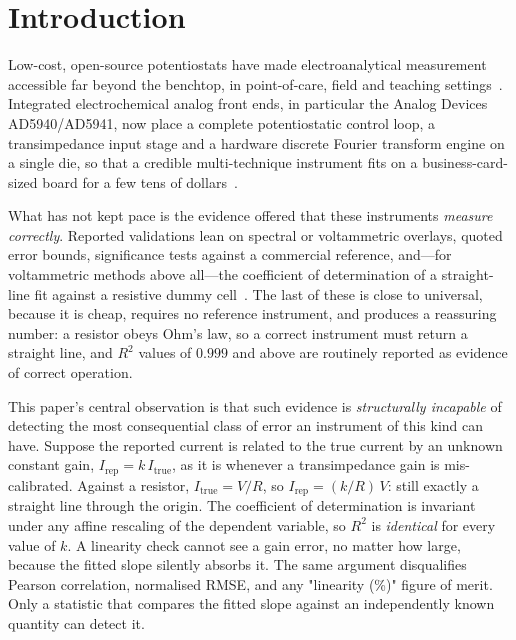 \section{Introduction}
\label{sec:intro}

Low-cost, open-source potentiostats have made electroanalytical measurement
accessible far beyond the benchtop, in point-of-care, field and teaching
settings~\cite{rowe2011cheapstat, jenkins2019abe, brown2022acestat,
bautista2025helpstat, anshori2025ganestat}. Integrated electrochemical analog
front ends, in particular the Analog Devices AD5940/AD5941, now place a
complete potentiostatic control loop, a transimpedance input stage and a
hardware discrete Fourier transform engine on a single die, so that a credible
multi-technique instrument fits on a business-card-sized board for a few tens of
dollars~\cite{devices2024ad5940, bill2023electrochemical, vamos2025hunstat2}.

What has not kept pace is the evidence offered that these instruments
\emph{measure correctly}. Reported validations lean on spectral or voltammetric
overlays, quoted error bounds, significance tests against a commercial
reference, and---for voltammetric methods above all---the coefficient of
determination of a straight-line fit against a resistive dummy
cell~\cite{pruna2018low, matsubara2021small, burgos2022tbistat,
vamos2025hunstat2}. The last of these is close to universal, because it is
cheap, requires no reference instrument, and produces a reassuring number: a
resistor obeys Ohm's law, so a correct instrument must return a straight line,
and $R^2$ values of $0.999$ and above are routinely reported as evidence of
correct operation.

This paper's central observation is that such evidence is \emph{structurally
incapable} of detecting the most consequential class of error an instrument of
this kind can have. Suppose the reported current is related to the true current
by an unknown constant gain, $I_{\mathrm{rep}} = k\,I_{\mathrm{true}}$, as it
is whenever a transimpedance gain is mis-calibrated. Against a resistor,
$I_{\mathrm{true}} = V/R$, so $I_{\mathrm{rep}} = (k/R)\,V$: still exactly a
straight line through the origin. The coefficient of determination is invariant
under any affine rescaling of the dependent variable, so $R^2$ is
\emph{identical} for every value of $k$. A linearity check cannot see a gain
error, no matter how large, because the fitted slope silently absorbs it. The
same argument disqualifies Pearson correlation, normalised RMSE, and any
"linearity (\%)" figure of merit. Only a statistic that compares the fitted
slope against an independently known quantity can detect it.

